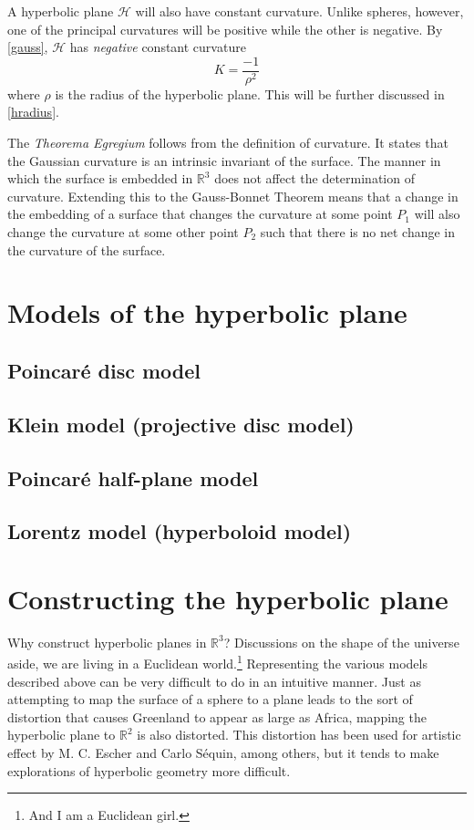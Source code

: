 \documentclass[letterpaper,titlepage]{article}
\newcommand{\esp}{$\mathbb{R}^3$}
\begin{document}
A hyperbolic plane $\mathcal{H}$ will also have constant curvature.
Unlike spheres, however, one of the principal curvatures will be positive while the other is negative.
By \eqref{gauss}, $\mathcal{H}$ has \emph{negative} constant curvature
\begin{equation}
K = \frac{-1}{\rho^2}
\label{hcurve}
\end{equation}
where $\rho$ is the radius of the hyperbolic plane. This will be further discussed in \ref{hradius}.

The \emph{Theorema Egregium} follows from the definition of curvature.
It states that the Gaussian curvature is an intrinsic invariant of the surface.\cite{gauss}
The manner in which the surface is embedded in $\mathbb{R}^3$ does not affect the determination of curvature.
Extending this to the Gauss-Bonnet Theorem means that a change in the embedding of a surface that changes the curvature at some point $P_1$ will also change the curvature at some other point $P_2$ such that there is no net change in the curvature of the surface.\cite{makingmath}

\section{Models of the hyperbolic plane}
\subsection{Poincar\'e disc model}
\subsection{Klein model (projective disc model)}
\subsection{Poincar\'e half-plane model}
\subsection{Lorentz model (hyperboloid model)}

\section{Constructing the hyperbolic plane}
Why construct hyperbolic planes in \esp?
Discussions on the shape of the universe aside, we are living in a Euclidean world.\footnote{And I am a Euclidean girl.\cite{madonna}}
Representing the various models described above can be very difficult to do in an intuitive manner.
Just as attempting to map the surface of a sphere to a plane leads to the sort of distortion that causes Greenland to appear as large as Africa, mapping the hyperbolic plane to $\mathbb{R}^2$ is also distorted.\cite{makingmath}
This distortion has been used for artistic effect by M. C. Escher and Carlo S\'equin, among others, but it tends to make explorations of hyperbolic geometry more difficult.\cite{adventures}
\end{document}
